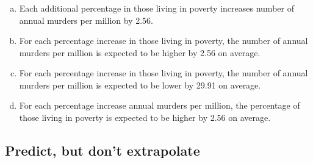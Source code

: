 \documentclass[11pt,containsverbatim,handout,xcolor=xelatex,dvipsnames,table]{beamer}
\newcommand{\solnMult}[1]{#1}
\newcommand{\soln}[1]{}
\begin{document}

\begin{frame}
\frametitle{}

\vfill


\vfill

\end{frame}


\begin{frame}
\frametitle{}


\soln{\[ \widehat{murders} = -29.91 + 2.56~poverty \]}

\begin{enumerate}[(a)]
\item Each additional percentage in those living in poverty increases number of annual murders per million by 2.56.
\item \solnMult{For each percentage increase in those living in poverty, the number of annual murders per million is expected to be higher by 2.56 on average.}
\item For each percentage increase in those living in poverty, the number of annual murders per million is expected to be lower by 29.91 on average.
\item For each percentage increase annual murders per million, the percentage of those living in poverty is expected to be higher by 2.56 on average.
\end{enumerate}

\end{frame}


\subsection{Predict, but don't extrapolate}
\label{mi4}

\end{document}
